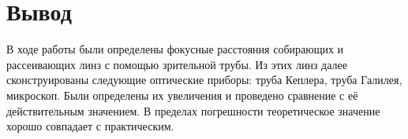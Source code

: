 \documentclass[a5paper,10pt, twoside]{article} %
\begin{document}
\section{Вывод}
В ходе работы были определены фокусные расстояния собирающих и рассеивающих линз с помощью
зрительной трубы. 
\newline
Из этих линз далее сконструированы следующие оптические приборы: труба Кеплера, труба
Галилея, микроскоп. 
\newline
Были определены их увеличения и проведено сравнение с её действительным значением. В пределах
погрешности теоретическое значение хорошо совпадает с практическим.
\end{document}
